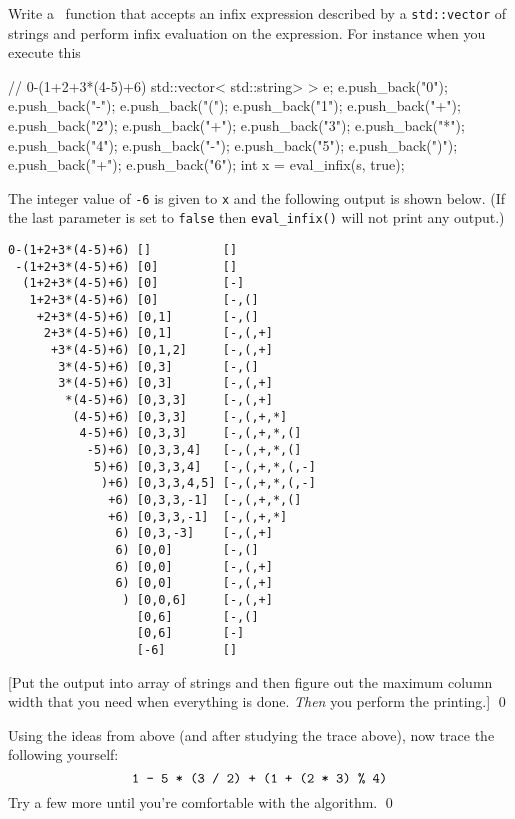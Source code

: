 \begin{ex}
Write a \cpp\ function that accepts an infix expression
described by a \verb!std::vector! of strings
and perform infix evaluation on the expression.
For instance
when you execute this
\begin{console}
// 0-(1+2+3*(4-5)+6)
std::vector< std::string> > e;
e.push_back("0");
e.push_back("-");
e.push_back("(");
e.push_back("1");
e.push_back("+");
e.push_back("2");
e.push_back("+");
e.push_back("3");
e.push_back("*");
e.push_back("4");
e.push_back("-");
e.push_back("5");
e.push_back(")");
e.push_back("+");
e.push_back("6");
int x = eval_infix(s, true);
\end{console}
The integer value of \verb!-6! is given to \texttt{x} and
the following output is shown below.
(If the last parameter is set to \texttt{false} then \verb!eval_infix()!
will not print any output.)
{\small
\begin{Verbatim}[frame=single]
0-(1+2+3*(4-5)+6) []          []
 -(1+2+3*(4-5)+6) [0]         []
  (1+2+3*(4-5)+6) [0]         [-]
   1+2+3*(4-5)+6) [0]         [-,(]
    +2+3*(4-5)+6) [0,1]       [-,(]
     2+3*(4-5)+6) [0,1]       [-,(,+] 
      +3*(4-5)+6) [0,1,2]     [-,(,+] 
       3*(4-5)+6) [0,3]       [-,(]
       3*(4-5)+6) [0,3]       [-,(,+]
        *(4-5)+6) [0,3,3]     [-,(,+]
         (4-5)+6) [0,3,3]     [-,(,+,*]
          4-5)+6) [0,3,3]     [-,(,+,*,(]
           -5)+6) [0,3,3,4]   [-,(,+,*,(]  
            5)+6) [0,3,3,4]   [-,(,+,*,(,-]
             )+6) [0,3,3,4,5] [-,(,+,*,(,-]
              +6) [0,3,3,-1]  [-,(,+,*,(]
              +6) [0,3,3,-1]  [-,(,+,*]
               6) [0,3,-3]    [-,(,+]
               6) [0,0]       [-,(]
               6) [0,0]       [-,(,+]
               6) [0,0]       [-,(,+]
                ) [0,0,6]     [-,(,+]
                  [0,6]       [-,(]
                  [0,6]       [-]
                  [-6]        []
\end{Verbatim}
}
[Put the output into array of strings and then figure out the maximum column width
that you need when everything is done. \textit{Then} you perform the printing.]
\qed
\end{ex}
  

\begin{ex}
Using the ideas from above (and after studying the trace above),
now trace the following yourself:
\[
\text{\texttt{1 - 5 * (3 / 2) + (1 + (2 * 3) \% 4)}}
\]
Try a few more until you're comfortable with the algorithm.
\qed
\end{ex}



